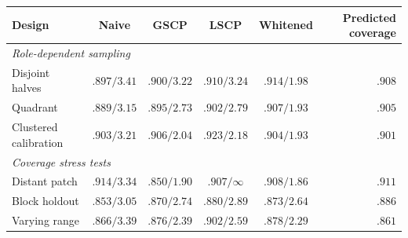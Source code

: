 \begin{tabular}{lccccr}
\toprule
Design & Naive & GSCP & LSCP & Whitened & Predicted coverage\\
\midrule
\multicolumn{6}{l}{\emph{Role-dependent sampling}}\\
Disjoint halves & $.897/3.41$ & $.900/3.22$ & $.910/3.24$ & $.914/\mathbf{1.98}$ & $.908$\\
Quadrant & $.889/3.15$ & $.895/2.73$ & $.902/2.79$ & $.907/\mathbf{1.93}$ & $.905$\\
Clustered calibration & $.903/3.21$ & $.906/2.04$ & $.923/2.18$ & $.904/\mathbf{1.93}$ & $.901$\\
\midrule
\multicolumn{6}{l}{\emph{Coverage stress tests}}\\
Distant patch & $.914/3.34$ & $.850/1.90$ & $.907/\infty$ & $.908/\mathbf{1.86}$ & $.911$\\
Block holdout & $.853/3.05$ & $.870/2.74$ & $.880/2.89$ & $.873/\mathbf{2.64}$ & $.886$\\
Varying range & $.866/3.39$ & $.876/2.39$ & $.902/2.59$ & $.878/\mathbf{2.29}$ & $.861$\\
\bottomrule
\end{tabular}
